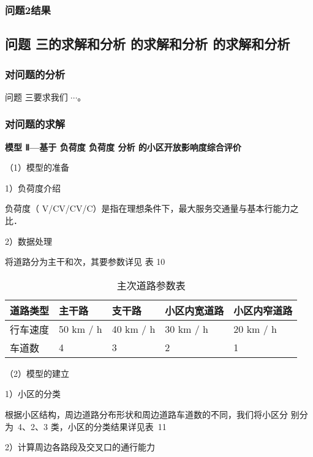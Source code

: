 \documentclass[12pt,a4paper]{nmmcm}
\begin{document}
\subsubsection{问题2结果}




\subsection{问题 三的求解和分析 的求解和分析 的求解和分析}

\subsubsection{对问题的分析}

问题 三要求我们 $\cdots$。

\subsubsection{对问题的求解}

\textbf{模型 Ⅱ—基于 负荷度 负荷度 分析 的小区开放影响度综合评价}

（1）模型的准备

1）负荷度介绍

负荷度（ V/CV/CV/C）是指在理想条件下，最大服务交通量与基本行能力之比．

2）数据处理

将道路分为主干和次，其要参数详见 表 10

\begin{table*}[h!]
  \centering
  \small
  \tabcolsep 2.5pt
  \caption{主次道路参数表}
  \begin{tabular*}{0.8\linewidth}{p{60pt}<{\centering}p{60pt}<{\centering}
    p{60pt}<{\centering}p{80pt}<{\centering}p{80pt}<{\centering}}
    \toprule
    道路类型  &  主干路  &  支干路  &  小区内宽道路  &  小区内窄道路  \\
    \midrule
    行车速度  & 50 km / h & 40 km / h & 30 km / h & 20 km / h \\
    车道数  & 4 & 3 & 2 & 1 \\
    \bottomrule
  \end{tabular*}
  \label{tab10}
\end{table*}

（2）模型的建立

1）小区的分类

根据小区结构，周边道路分布形状和周边道路车道数的不同，我们将小区分
别分为~4、2、3 类，小区的分类结果详见表~11


2）计算周边各路段及交叉口的通行能力
\end{document}
